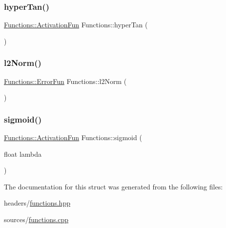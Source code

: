 \mbox{\label{structFunctions_a0aac84382fccbc38cacccd566434d4a8}} 
\subsubsection{\texorpdfstring{hyper\+Tan()}{hyperTan()}}
{\footnotesize\ttfamily \hyperlink{structFunctions_ad25362ffa52b2f7933431190546593ac}{Functions\+::\+Activation\+Fun} Functions\+::hyper\+Tan (\begin{DoxyParamCaption}{ }\end{DoxyParamCaption})\hspace{0.3cm}{\ttfamily [static]}}

\mbox{\label{structFunctions_a00bac40f42bb6c47d25c0cd238c4275a}} 
\subsubsection{\texorpdfstring{l2\+Norm()}{l2Norm()}}
{\footnotesize\ttfamily \hyperlink{structFunctions_a834bc4170f1caa8c77272ecf51dbae5c}{Functions\+::\+Error\+Fun} Functions\+::l2\+Norm (\begin{DoxyParamCaption}{ }\end{DoxyParamCaption})\hspace{0.3cm}{\ttfamily [static]}}

\mbox{\label{structFunctions_a773de9cd59f7ccc3e2fe9822f0536ae4}} 
\subsubsection{\texorpdfstring{sigmoid()}{sigmoid()}}
{\footnotesize\ttfamily \hyperlink{structFunctions_ad25362ffa52b2f7933431190546593ac}{Functions\+::\+Activation\+Fun} Functions\+::sigmoid (\begin{DoxyParamCaption}\item[{float}]{lambda }\end{DoxyParamCaption})\hspace{0.3cm}{\ttfamily [static]}}



The documentation for this struct was generated from the following files\+:\begin{DoxyCompactItemize}
\item 
headers/\hyperlink{functions_8hpp}{functions.\+hpp}\item 
sources/\hyperlink{functions_8cpp}{functions.\+cpp}\end{DoxyCompactItemize}
